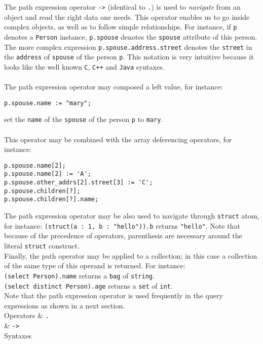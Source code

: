 The path expression operator \texttt{->} (identical to \texttt{.}) is used
to \emph{navigate} from an object
and read the right data one needs. This operator enables us to go
inside complex objects, as well as to follow simple relationships.
For instance, if \texttt{p} denotes a \texttt{Person} instance,
\texttt{p.spouse} denotes the \texttt{spouse} attribute of this person.\\
The more complex expression \texttt{p.spouse.address.street} denotes
the \texttt{street} in the \texttt{address} of \texttt{spouse} of the
person \texttt{p}. This notation is very intuitive because it looks like the
well known \texttt{C}, \texttt{C++} and \texttt{Java} syntaxes.\\
\\
The path expression operator may composed a left value, for instance:
\begin{verbatim}
p.spouse.name := "mary";
\end{verbatim}
set the \texttt{name} of the \texttt{spouse} of the person \texttt{p}
to \texttt{mary}.\\
\\
This operator may be combined with the array deferencing operators, for
instance:
\begin{verbatim}
p.spouse.name[2];
p.spouse.name[2] := 'A';
p.spouse.other_addrs[2].street[3] := 'C';
p.spouse.children[?];
p.spouse.children[?].name;
\end{verbatim}
The path expression operator may be also used to navigate through
\texttt{struct} atom, for instance:
\texttt{(struct(a : 1, b : "hello")).b} returns \texttt{"hello"}. Note
that because of the precedence of operators, parenthesis are necessary
around the literal \texttt{struct} construct.\\
Finally, the path operator may be applied to a collection; in this
case a collection of the same type of this operand is returned.
For instance:\\
\texttt{(select Person).name} returns a \texttt{bag} of \texttt{string}.\\
\texttt{(select distinct Person).age} returns a \texttt{set} of
\texttt{int}.\\
Note that the path expression operator is used frequently in the query
expressions as shown in a next section.
\geninfo\\
\hline Operators
 & \texttt{.} \\
 & \texttt{->} \\
\hline Syntaxes
